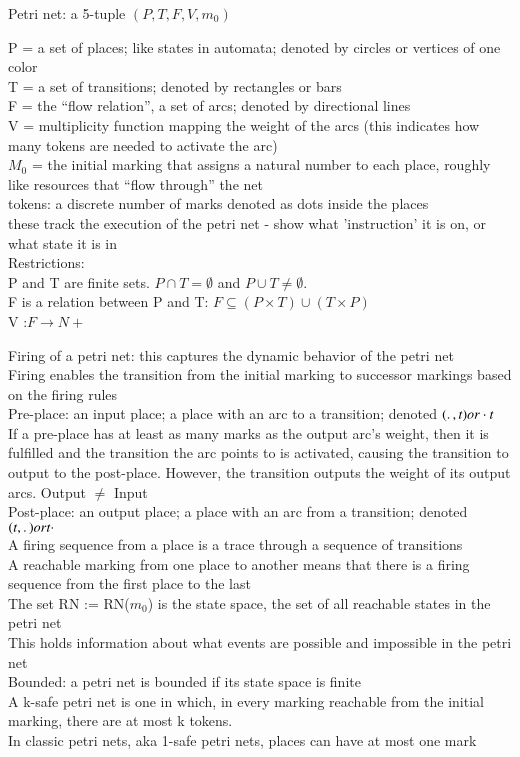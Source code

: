 \begin{definition}
\label{def:Petri-net}
Petri net: a 5-tuple $(P, T, F, V, m_0)$ 

P = a set of places; like states in automata; denoted by circles or vertices of one color\\
T = a set of transitions; denoted by rectangles or bars\\
F = the “flow relation”, a set of arcs; denoted by directional lines\\
V = multiplicity function mapping the weight of the arcs (this indicates how many tokens are needed to activate the arc)\\
$M_0$ = the initial marking that assigns a natural number to each place, roughly like resources that “flow through” the net\\
	tokens: a discrete number of marks denoted as dots inside the places \\
	these track the execution of the petri net - show what 'instruction' it is on, or what state it is in\\
	
\noindent Restrictions: \\
P and T are finite sets. $P\cap T = \emptyset$   and $P\cup T \neq \emptyset.$\\
F is a relation between P and T: $ F \subseteq (P \times T) \cup (T \times P)$\\
V :$ F \rightarrow N+ $\\
\end {definition}
Firing of a petri net: this captures the dynamic behavior of the petri net\\
Firing enables the transition from the initial marking to successor markings based on the firing rules\\
Pre-place: an input place; a place with an arc to a transition; denoted $(\ldotp , t) or  \cdot t$\\
If a pre-place has at least as many marks as the output arc's weight, then it is fulfilled and the transition the arc points to is activated, causing the transition to output to the post-place. However, the transition outputs the weight of its output arcs. Output $\ne$ Input\\
Post-place: an output place; a place with an arc from a transition; denoted $(t, \ldotp ) or t \cdot $ \\
A firing sequence from a place is a trace through a sequence of transitions\\
A reachable marking from one place to another means that there is a firing sequence from the first place to the last\\
The set RN := RN($m_0$) is the state space, the set of all reachable states in the petri net\\
This holds information about what events are possible and impossible in the petri net\\
Bounded: a petri net is bounded if its state space is finite \smallskip\\

A k-safe petri net is one in which, in every marking reachable from the initial marking, there are at most k tokens.\\
In classic petri nets, aka 1-safe petri nets, places can have at most one mark\\
 

